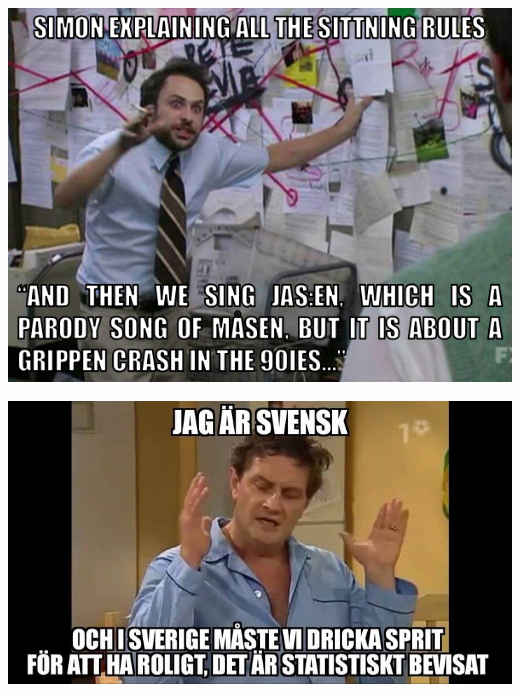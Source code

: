 \documentclass{article}
\title{\vspace{40em}\textbf{\color{white}\Huge{}}}
\date{\vspace{-3em}\color{white}}
\author{}
\begin{document}
\customtitle
\BgThispage
\clearpage

\newpage

\sffamily


\vfill
\includegraphics[width=0.9\linewidth]{images/memes/jasen.png}

\vfill
\newpage

\normalfont
\sitsit
\vfill

\sffamily
\vfill

\includegraphics[width=0.9\linewidth]{images/memes/jar-ar-svensk.jpg}
\vfill


\newpage
\end{document}
